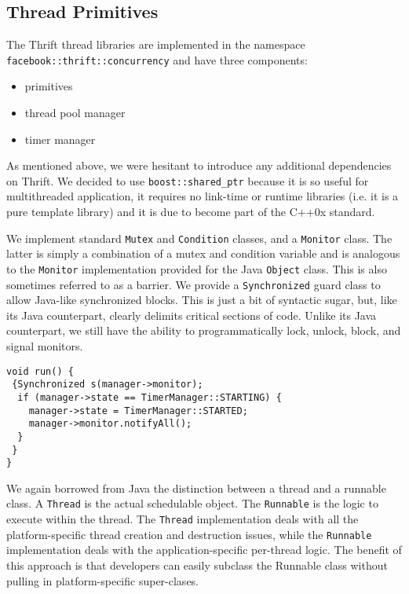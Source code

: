 \documentclass[nocopyrightspace,blockstyle]{sigplanconf}
\begin{document}
\subsection{Thread Primitives}

The Thrift thread libraries are implemented in the namespace\\
\texttt{facebook::thrift::concurrency} and have three components:
\begin{itemize}
\item primitives
\item thread pool manager
\item timer manager
\end{itemize}

As mentioned above, we were hesitant to introduce any additional dependencies
on Thrift. We decided to use \texttt{boost::shared\_ptr} because it is so 
useful for multithreaded application, it requires no link-time or
runtime libraries (i.e. it is a pure template library) and it is due
to become part of the C++0x standard.

We implement standard \texttt{Mutex} and \texttt{Condition} classes, and a
 \texttt{Monitor} class. The latter is simply a combination of a mutex and 
condition variable and is analogous to the \texttt{Monitor} implementation provided for
the Java \texttt{Object} class. This is also sometimes referred to as a barrier. We 
provide a \texttt{Synchronized} guard class to allow Java-like synchronized blocks.
This is just a bit of syntactic sugar, but, like its Java counterpart, clearly 
delimits critical sections of code. Unlike its Java counterpart, we still
have the ability to programmatically lock, unlock, block, and signal monitors.

\begin{verbatim}
void run() {
 {Synchronized s(manager->monitor);
  if (manager->state == TimerManager::STARTING) {
    manager->state = TimerManager::STARTED;
    manager->monitor.notifyAll();
  }
 }
}
\end{verbatim}

We again borrowed from Java the distinction between a thread and a runnable
class. A \texttt{Thread} is the actual schedulable object. The
\texttt{Runnable} is the logic to execute within the thread. 
The \texttt{Thread} implementation deals with all the platform-specific thread 
creation and destruction issues, while the \texttt{Runnable} implementation deals
with the application-specific per-thread logic. The benefit of this approach
is that developers can easily subclass the Runnable class without pulling in 
platform-specific super-clases.
\end{document}
